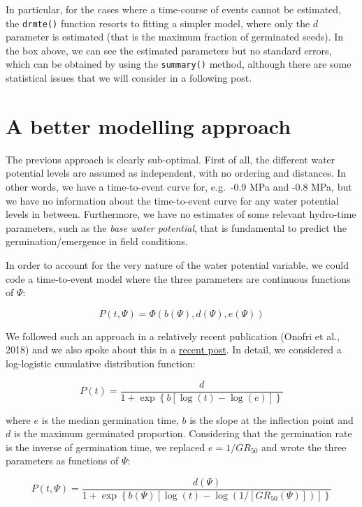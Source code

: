 \documentclass[
]{book}
\begin{document}
In particular, for the cases where a time-course of events cannot be estimated, the \texttt{drmte()} function resorts to fitting a simpler model, where only the \(d\) parameter is estimated (that is the maximum fraction of germinated seeds). In the box above, we can see the estimated parameters but no standard errors, which can be obtained by using the \texttt{summary()} method, although there are some statistical issues that we will consider in a following post.

\hypertarget{a-better-modelling-approach}{%
\section{A better modelling approach}\label{a-better-modelling-approach}}

The previous approach is clearly sub-optimal. First of all, the different water potential levels are assumed as independent, with no ordering and distances. In other words, we have a time-to-event curve for, e.g.~-0.9 MPa and -0.8 MPa, but we have no information about the time-to-event curve for any water potential levels in between. Furthermore, we have no estimates of some relevant hydro-time parameters, such as the \emph{base water potential}, that is fundamental to predict the germination/emergence in field conditions.

In order to account for the very nature of the water potential variable, we could code a time-to-event model where the three parameters are continuous functions of \(\Psi\):

\[P(t, \Psi) = \Phi \left( b(\Psi), d(\Psi), e(\Psi) \right)\]

We followed such an approach in a relatively recent publication (Onofri et al., 2018) and we also spoke about this in a \href{https://www.statforbiology.com/2020/stat_seedgermination_ht1step/}{recent post}. In detail, we considered a log-logistic cumulative distribution function:

\[P(t) = \frac{ d }{1 + \exp \left\{ b \left[ \log(t) - \log( e ) \right] \right\} }\]

where \(e\) is the median germination time, \(b\) is the slope at the inflection point and \(d\) is the maximum germinated proportion. Considering that the germination rate is the inverse of germination time, we replaced \(e = 1/GR_{50}\) and wrote the three parameters as functions of \(\Psi\):

\[P(t, \Psi) = \frac{ d(\Psi) }{1 + \exp \left\{ b(\Psi) \left[ \log(t) - \log(1 / \left[ GR_{50}(\Psi) \right] ) \right] \right\} }\]
\end{document}
